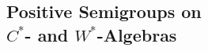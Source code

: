 % 
%
%

\begin{partbacktext}
\part{Positive Semigroups on \\$C^{*}$- and $W^{*}$-Algebras}
\end{partbacktext}